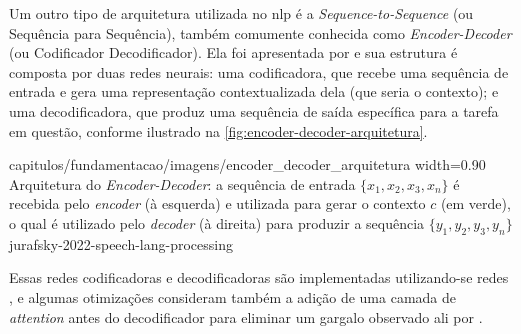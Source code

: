 


Um outro tipo de arquitetura utilizada no \acrshort{nlp} é a \textit{Sequence-to-Sequence} (ou Sequência para Sequência), também comumente conhecida como \textit{Encoder-Decoder} (ou Codificador Decodificador). Ela foi apresentada por  e sua estrutura é composta por duas redes neurais: uma codificadora, que recebe uma sequência de entrada e gera uma representação contextualizada dela (que seria o contexto); e uma decodificadora, que produz uma sequência de saída específica para a tarefa em questão, conforme ilustrado na \autoref{fig:encoder-decoder-arquitetura}. 

{capitulos/fundamentacao/imagens/encoder_decoder_arquitetura}
{width=0.90\textwidth}
{Arquitetura do \textit{Encoder-Decoder}: a sequência de entrada \(\{x_1, x_2, x_3, x_n\}\) é recebida pelo \textit{encoder} (à esquerda) e utilizada para gerar o contexto \(c\) (em verde), o qual é utilizado pelo \textit{decoder} (à direita) para produzir a sequência \(\{y_1, y_2, y_3, y_n\}\)}
{jurafsky-2022-speech-lang-processing}


Essas redes codificadoras e decodificadoras são implementadas utilizando-se redes , e algumas otimizações consideram também a adição de uma camada de \textit{attention} antes do decodificador para eliminar um gargalo observado ali por .





